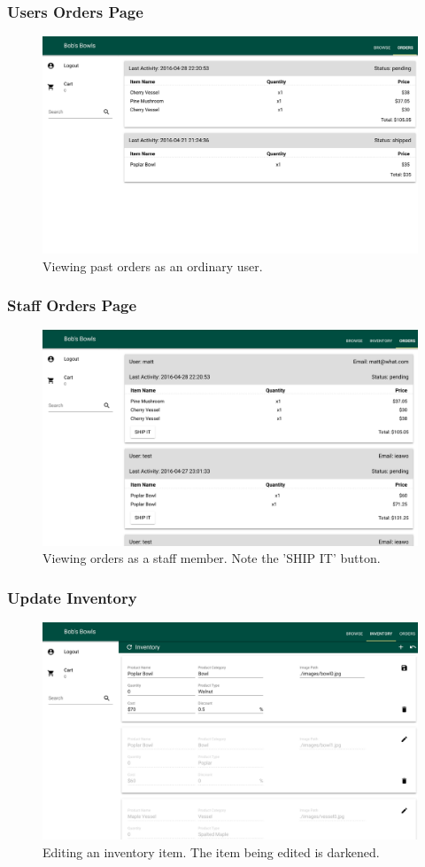 \documentclass[letterpaper]{article}
\begin{document}
\subsubsection{Users Orders Page}
\begin{figure}[H]
\centering
\includegraphics[width=.8\textwidth]{user-orders}
\caption{Viewing past orders as an ordinary user.}
\label{cap-user-orders}
\end{figure}

\subsubsection{Staff Orders Page}
\begin{figure}[H]
\centering
\includegraphics[width=.8\textwidth]{staff-orders}
\caption{Viewing orders as a staff member. Note the 'SHIP IT' button.}
\label{cap-staff-orders}
\end{figure}


\subsubsection{Update Inventory}
\begin{figure}[H]
\centering
\includegraphics[width=.8\textwidth]{update-inventory}
\caption{Editing an inventory item. The item being edited is darkened.}
\label{cap-update-inventory}
\end{figure}
\end{document}

